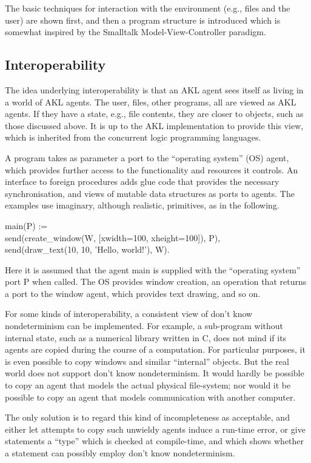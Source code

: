 The basic techniques for interaction with the environment (e.g., files
and the user) are shown first, and then a program structure is
introduced which is somewhat inspired by the Smalltalk
Model-View-Controller paradigm.

\subsection{Interoperability}

The idea underlying interoperability is that an AKL agent sees itself
as living in a world of AKL agents.  The user, files, other programs,
all are viewed as AKL agents.  If they have a state, e.g., file
contents, they are closer to objects, such as those discussed
above.  It is up to the AKL implementation to provide this view, which
is inherited from the concurrent logic programming languages.

A program takes as parameter a port to the ``operating system'' (OS)
agent, which provides further access to the functionality and
resources it controls.  An interface to foreign procedures adds glue
code that provides the necessary synchronisation, and views of mutable
data structures as ports to agents.  The examples use imaginary,
although realistic, primitives, as in the following.
%
\begin{program}
main(P) := \\
\>\>	send(create_window(W, [xwidth=100, xheight=100]), P), \\
\>\>	send(draw_text(10, 10, 'Hello, world!'), W).
\end{program}%
%
Here it is assumed that the agent main is supplied with the
``operating system'' port P when called.  The OS provides window
creation, an operation that returns a port to the window agent, which
provides text drawing, and so on.

For some kinds of interoperability, a consistent view of don't know
nondeterminism can be implemented.  For example, a sub-program without
internal state, such as a numerical library written in C, does not
mind if its agents are copied during the course of a computation.  For
particular purposes, it is even possible to copy windows and similar
``internal'' objects.  But the real world does not support don't know
nondeterminism.  It would hardly be possible to copy an agent that
models the actual physical file-system; nor would it be possible to
copy an agent that models communication with another computer.

The only solution is to regard this kind of incompleteness as
acceptable, and either let attempts to copy such unwieldy agents
induce a run-time error, or give statements a ``type'' which is
checked at compile-time, and which shows whether a statement can
possibly employ don't know nondeterminism.

